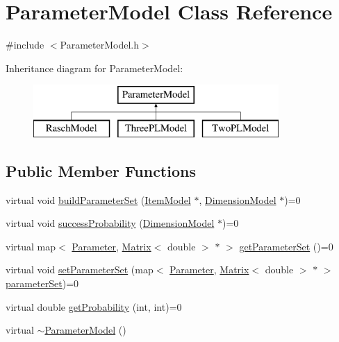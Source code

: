 \hypertarget{classParameterModel}{}\section{Parameter\+Model Class Reference}
\label{classParameterModel}


{\ttfamily \#include $<$Parameter\+Model.\+h$>$}

Inheritance diagram for Parameter\+Model\+:\begin{figure}[H]
\begin{center}
\leavevmode
\includegraphics[height=2.000000cm]{classParameterModel}
\end{center}
\end{figure}
\subsection*{Public Member Functions}
\begin{DoxyCompactItemize}
\item 
virtual void \hyperlink{classParameterModel_a2f02140d0b27796ccdaf9cadbccb2e2f}{build\+Parameter\+Set} (\hyperlink{classItemModel}{Item\+Model} $\ast$, \hyperlink{classDimensionModel}{Dimension\+Model} $\ast$)=0
\item 
virtual void \hyperlink{classParameterModel_a13249755ab9078be82262896beff5c17}{success\+Probability} (\hyperlink{classDimensionModel}{Dimension\+Model} $\ast$)=0
\item 
virtual map$<$ \hyperlink{ParameterModel_8h_a04ed5b8f1f3adf7af1d5092fae847e90}{Parameter}, \hyperlink{singletonMatrix}{Matrix}$<$ double $>$ $\ast$ $>$ \hyperlink{classParameterModel_aa4e52819318c9dcc9087a36d1a940c0b}{get\+Parameter\+Set} ()=0
\item 
virtual void \hyperlink{classParameterModel_aa13375bcd79d7c1afbde0a8f179f38cb}{set\+Parameter\+Set} (map$<$ \hyperlink{ParameterModel_8h_a04ed5b8f1f3adf7af1d5092fae847e90}{Parameter}, \hyperlink{singletonMatrix}{Matrix}$<$ double $>$ $\ast$ $>$ \hyperlink{classParameterModel_a0b5dafa68a235673a229863aa66ae97d}{parameter\+Set})=0
\item 
virtual double \hyperlink{classParameterModel_ac706c102c88bb20f5d47e61eb8d5dc7e}{get\+Probability} (int, int)=0
\item 
virtual \hyperlink{classParameterModel_a55dd5151867a9359aa27a430432f6889}{$\sim$\+Parameter\+Model} ()
\end{DoxyCompactItemize}
